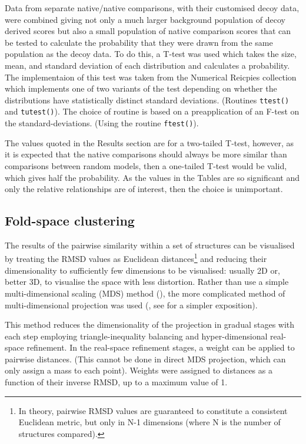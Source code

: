 \documentclass[preprint,12pt]{elsarticle}
\begin{document}
Data from separate native/native comparisons, with their customised decoy data, were combined
giving not only a much larger background population of decoy derived scores but also a small
population of native comparison scores that can be tested to calculate the probability that
they were drawn from the same population as the decoy data.  To do this, a T-test was used which
takes the size, mean, and standard deviation of each distribution and calculates a probability.
The implementaion of this test was taken from the Numerical Reicpies collection \cite{PressWHet86}
which implements one of two variants of the test depending on whether the distributions
have statistically distinct standard deviations. (Routines {\tt ttest()} and {\tt tutest()}).
The choice of routine is based on a preapplication of an F-test on the standard-deviations.
(Using the routine {\tt ftest()}).

The values quoted in the Results section are for a two-tailed T-test, however, as it is expected
that the native comparisons should always be more similar than comparisons between random models,
then a one-tailed T-test would be valid, which gives half the probability.   As the values
in the Tables are so significant and only the relative relationships are of interest,
then the choice is unimportant.

\subsection{Fold-space clustering}

The results of the pairwise similarity within a set of structures can be visualised by treating the
RMSD values as Euclidean distances\footnote{In theory, pairwise RMSD values are guaranteed to constitute
a consistent Euclidean metric, but only in N-1 dimensions (where N is the number of structures compared).
} and reducing their dimensionality to sufficiently few dimensions to be visualised: usually 2D or,
better 3D, to visualise the space with less distortion.
Rather than use a simple multi-dimensional scaling (MDS) method (\cite{BrownNPet96}), the more complicated
method of multi-dimensional projection was used (\cite{AszodiAet97a}, see \cite{TaylorWRet01b} for a
simpler exposition).

This method reduces the dimensionality of the projection in gradual stages
with each step employing triangle-inequality balancing and hyper-dimensional real-space refinement.
In the real-space refinement stages, a weight can be applied to pairwise distances. (This cannot be
done in direct MDS projection, which can only assign a mass to each point).
Weights were assigned to distances as a function of their inverse RMSD, up to a maximum value of 1.
\end{document}
